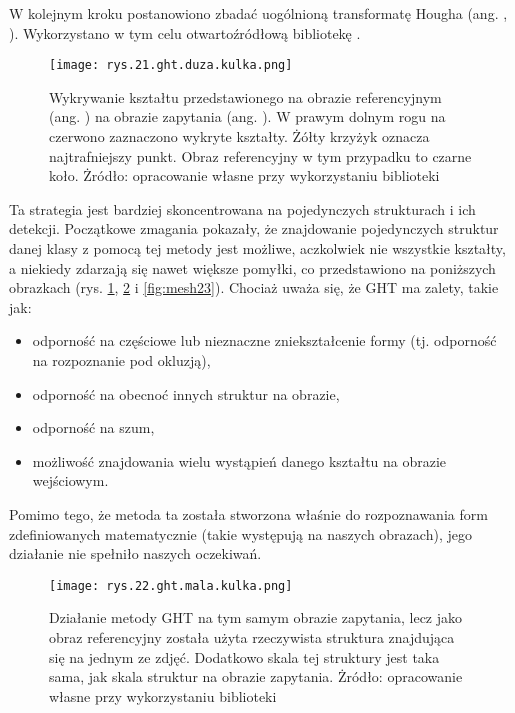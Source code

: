 W kolejnym kroku postanowiono zbadać uogólnioną transformatę Hougha (ang. , ). Wykorzystano w tym celu otwartoźródłową bibliotekę . 
\begin{figure}[h]
    \centering
    \texttt{[image: rys.21.ght.duza.kulka.png]}
    \caption{Wykrywanie kształtu przedstawionego na obrazie referencyjnym (ang. ) na obrazie zapytania (ang. ). W prawym dolnym rogu na czerwono zaznaczono wykryte kształty. Żółty krzyżyk oznacza najtrafniejszy punkt. Obraz referencyjny w tym przypadku to czarne koło. Żródło: opracowanie własne przy wykorzystaniu biblioteki }
    \label{fig:mesh21}
\end{figure}
Ta strategia jest bardziej skoncentrowana na pojedynczych strukturach i ich detekcji. Początkowe zmagania pokazały, że znajdowanie pojedynczych struktur danej klasy z pomocą tej metody jest możliwe, aczkolwiek nie wszystkie kształty, a niekiedy zdarzają się nawet większe pomyłki, co przedstawiono na poniższych obrazkach (rys. \ref{fig:mesh21}, \ref{fig:mesh22} i \ref{fig:mesh23}). Chociaż uważa się, że GHT ma zalety, takie jak:
\begin{itemize}
	\item odporność na częściowe lub nieznaczne zniekształcenie formy (tj. odporność na rozpoznanie pod okluzją), 
	\item odporność na obecnoć innych struktur na obrazie,
	\item odporność na szum,
	\item możliwość znajdowania wielu wystąpień danego kształtu na obrazie wejściowym.
\end{itemize}
Pomimo tego, że metoda ta została stworzona właśnie do rozpoznawania form zdefiniowanych matematycznie (takie występują na naszych obrazach), jego działanie nie spełniło naszych oczekiwań.
\begin{figure}[h]
    \centering
    \texttt{[image: rys.22.ght.mala.kulka.png]}
    \caption{Działanie metody GHT na tym samym obrazie zapytania, lecz jako obraz referencyjny została użyta rzeczywista struktura znajdująca się na jednym ze zdjęć. Dodatkowo skala tej struktury jest taka sama, jak skala struktur na obrazie zapytania. Żródło: opracowanie własne przy wykorzystaniu biblioteki }
    \label{fig:mesh22}
\end{figure}
